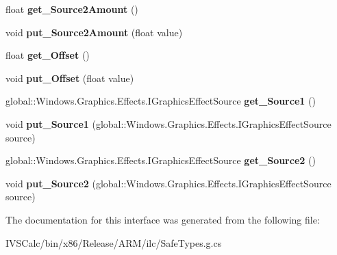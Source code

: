 \begin{DoxyCompactItemize}
float {\bfseries get\+\_\+\+Source2\+Amount} ()
\item 
\mbox{\label{interface_microsoft_1_1_graphics_1_1_canvas_1_1_effects_1_1_i_arithmetic_composite_effect_a32dc528c6a36ca0f429217cad7cfc842}} 
void {\bfseries put\+\_\+\+Source2\+Amount} (float value)
\item 
\mbox{\label{interface_microsoft_1_1_graphics_1_1_canvas_1_1_effects_1_1_i_arithmetic_composite_effect_ac654c386fc6dc5a81ae9d384de330120}} 
float {\bfseries get\+\_\+\+Offset} ()
\item 
\mbox{\label{interface_microsoft_1_1_graphics_1_1_canvas_1_1_effects_1_1_i_arithmetic_composite_effect_aa122230e9c4f1038dfe66672ee563ef2}} 
void {\bfseries put\+\_\+\+Offset} (float value)
\item 
\mbox{\label{interface_microsoft_1_1_graphics_1_1_canvas_1_1_effects_1_1_i_arithmetic_composite_effect_adc648fe111fba5afc3a6e920e2503c06}} 
global\+::\+Windows.\+Graphics.\+Effects.\+I\+Graphics\+Effect\+Source {\bfseries get\+\_\+\+Source1} ()
\item 
\mbox{\label{interface_microsoft_1_1_graphics_1_1_canvas_1_1_effects_1_1_i_arithmetic_composite_effect_a7b3208a857f819a8af336dabac95f484}} 
void {\bfseries put\+\_\+\+Source1} (global\+::\+Windows.\+Graphics.\+Effects.\+I\+Graphics\+Effect\+Source source)
\item 
\mbox{\label{interface_microsoft_1_1_graphics_1_1_canvas_1_1_effects_1_1_i_arithmetic_composite_effect_a2ad16e41b19c66c945a2a835fa2c2e34}} 
global\+::\+Windows.\+Graphics.\+Effects.\+I\+Graphics\+Effect\+Source {\bfseries get\+\_\+\+Source2} ()
\item 
\mbox{\label{interface_microsoft_1_1_graphics_1_1_canvas_1_1_effects_1_1_i_arithmetic_composite_effect_a5b2691a03c69315d1b56fe62d46de78f}} 
void {\bfseries put\+\_\+\+Source2} (global\+::\+Windows.\+Graphics.\+Effects.\+I\+Graphics\+Effect\+Source source)
\end{DoxyCompactItemize}


The documentation for this interface was generated from the following file\+:\begin{DoxyCompactItemize}
\item 
I\+V\+S\+Calc/bin/x86/\+Release/\+A\+R\+M/ilc/Safe\+Types.\+g.\+cs\end{DoxyCompactItemize}
